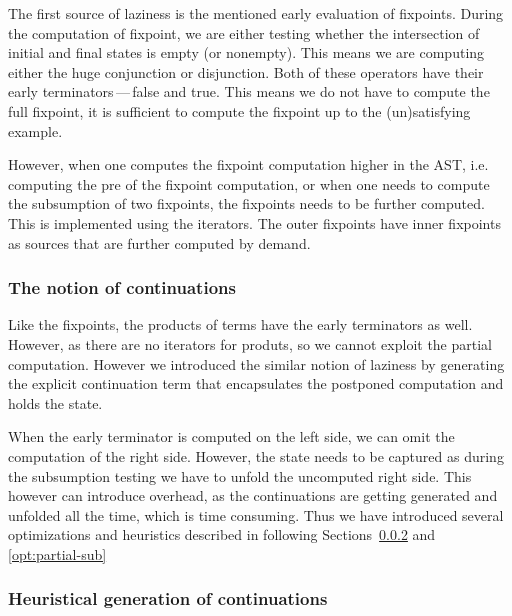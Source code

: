     The first source of laziness is the mentioned early evaluation
    of fixpoints. During the computation of fixpoint, we are either
    testing whether the intersection of initial and final states is
    empty (or nonempty). This means we are computing either the huge
    conjunction or disjunction. Both of these operators have their
    early terminators\,---\,false and true. This means we do not
    have to compute the full fixpoint, it is sufficient to compute
    the fixpoint up to the (un)satisfying example.
    
    However, when one computes the fixpoint computation higher in the
    AST, i.e. computing the pre of the fixpoint computation, or when
    one needs to compute the subsumption of two fixpoints, the 
    fixpoints needs to be further computed. This is implemented
    using the iterators. The outer fixpoints have inner fixpoints
    as sources that are further computed by demand.
  
    \subsubsection{The notion of continuations}    
    
    Like the fixpoints, the products of terms have the early 
    terminators as well. However, as there are no iterators for
    produts, so we cannot exploit the partial computation. However
    we introduced the similar notion of laziness by generating the
    explicit continuation term that encapsulates the postponed
    computation and holds the state. 
    
    When the early terminator is computed on the left side, we can
    omit the computation of the right side. However, the state needs
    to be captured as during the subsumption testing we have to
    unfold the uncomputed right side. This however can introduce
    overhead, as the continuations are getting generated and unfolded
    all the time, which is time consuming. Thus we have introduced 
    several optimizations and heuristics described in following
    Sections~\ref{opt:heuristic-cont} and \ref{opt:partial-sub}

    \subsubsection{Heuristical generation of continuations}\label{opt:heuristic-cont}    
    
